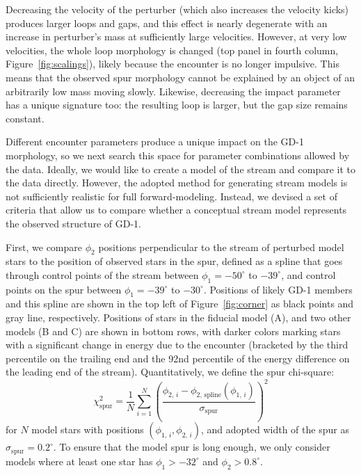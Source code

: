\documentclass[twocolumn]{aastex62}
\begin{document}
Decreasing the velocity of the perturber (which also increases the velocity kicks) produces larger loops and gaps, and this effect is nearly degenerate with an increase in perturber's mass at sufficiently large velocities.
However, at very low velocities, the whole loop morphology is changed (top panel in fourth column, Figure~\ref{fig:scalings}), likely because the encounter is no longer impulsive.
This means that the observed spur morphology cannot be explained by an object of an arbitrarily low mass moving slowly.
Likewise, decreasing the impact parameter has a unique signature too: the resulting loop is larger, but the gap size remains constant.

Different encounter parameters produce a unique impact on the GD-1 morphology, so we next search this space for parameter combinations allowed by the data.
Ideally, we would like to create a model of the stream and compare it to the data directly.
However, the adopted method for generating stream models is not sufficiently realistic for full forward-modeling.
Instead, we devised a set of criteria that allow us to compare whether a conceptual stream model represents the observed structure of GD-1.

First, we compare $\phi_2$ positions perpendicular to the stream of perturbed model stars to the position of observed stars in the spur, defined as a spline that goes through control points of the stream between $\phi_1=-50^\circ$ to $-39^\circ$, and control points on the spur between $\phi_1=-39^\circ$ to $-30^\circ$.
Positions of likely GD-1 members and this spline are shown in the top left of Figure~\ref{fig:corner} as black points and gray line, respectively.
Positions of stars in the fiducial model (A), and two other models (B and C) are shown in bottom rows, with darker colors marking stars with a significant change in energy due to the encounter (bracketed by the third percentile on the trailing end and the 92nd percentile of the energy difference on the leading end of the stream). 
Quantitatively, we define the spur chi-square:
\begin{equation}
\chi^2_\mathrm{spur} = \frac{1}{N}\sum_{i=1}^{N} \left(\frac{\phi_{2,\,i} - \phi_\mathrm{2,\,spline}(\phi_{1,\,i})}{\sigma_\mathrm{spur}}\right)^2 
\end{equation}
for $N$ model stars with positions $(\phi_{1,\,i}, \phi_{2,\,i})$, and adopted width of the spur as $\sigma_\mathrm{spur} = 0.2^\circ$.
To ensure that the model spur is long enough, we only consider models where at least one star has $\phi_1>-32^\circ$ and $\phi_2>0.8^\circ$.
\end{document}
